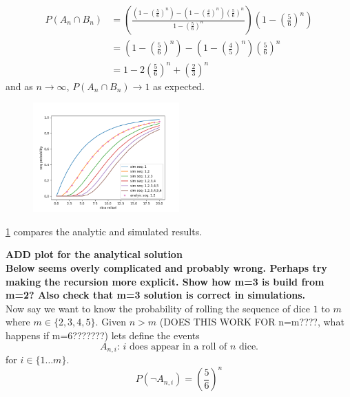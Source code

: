\documentclass[12pt,a4paper]{article}
\begin{document}
\begin{align*}
P(A_n \cap B_n) &= \left(\frac{\left(1-\left(\frac{5}{6}\right)^n\right) - \left(1-\left(\frac{4}{5}\right)^n\right)\left(\frac{5}{6}\right)^n}{1-\left(\frac{5}{6}\right)^n}\right) \left(1 - \left(\frac{5}{6}\right)^n\right)\\
                &=  \left(1-\left(\frac{5}{6}\right)^n\right) - \left(1-\left(\frac{4}{5}\right)^n\right)\left(\frac{5}{6}\right)^n\\
                &= 1 - 2\left(\frac{5}{6}\right)^n + \left(\frac{2}{3}\right)^n
\end{align*}
and as $n\to\infty$, $P(A_n \cap B_n) \to 1$ as expected.\\

\begin{figure}[h]
    \centering
    \includegraphics[width=0.5\textwidth]{figs/compare_analytic_sim.png}
    \caption{}
    \label{fig:compare_analytic_sim}
\end{figure}
\cref{fig:compare_analytic_sim} compares the analytic and simulated results.

\textbf{ADD plot for the analytical solution}\\

\textbf{Below seems overly complicated and probably wrong. Perhaps try making the recursion more explicit. Show how m=3 is build from m=2? Also check that m=3 solution is correct in simulations.}\\

Now say we want to know the probability of rolling the sequence of dice $1$ to $m$ where $m\in\{2,3,4,5\}$. Given $n>m$ (DOES THIS  WORK FOR n=m????, what happens if m=6???????) lets define the events
\begin{equation}
A_{n,i} \text{: $i$ does appear in a roll of $n$ dice.}
\end{equation}
for $i \in \{1\ldots m\}$.\\

\begin{equation}
P(\neg A_{n,i}) = \left( \frac{5}{6} \right)^n
\label{eq:tmp2}
\end{equation}
\end{document}
